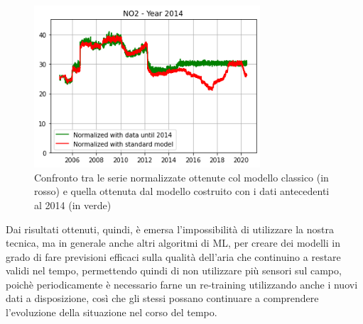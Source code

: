 \documentclass[a4paper]{report}
\begin{document}
\begin{figure}[h]
\centering
\includegraphics[width=0.75\textwidth]{no2_mantova_2014}
\caption{Confronto tra le serie normalizzate ottenute col modello classico (in rosso) e quella ottenuta dal modello costruito con i dati antecedenti al 2014 (in verde)}
\label{fig:no2_mantova_2014}
\end{figure}

Dai risultati ottenuti, quindi, è emersa l'impossibilità di utilizzare la nostra tecnica, ma in generale anche altri algoritmi di ML, per creare dei modelli in grado di fare previsioni efficaci sulla qualità dell'aria che continuino a restare validi nel tempo, permettendo quindi di non utilizzare più sensori sul campo, poichè periodicamente è necessario farne un re-training utilizzando anche i nuovi dati a disposizione, così che gli stessi possano continuare a comprendere l'evoluzione della situazione nel corso del tempo.  
\end{document}
